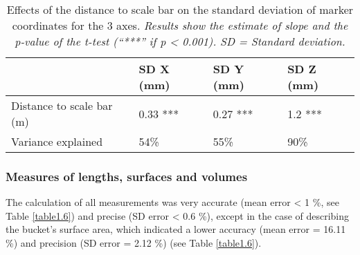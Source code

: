 \begin{table}[htbp]
  \centering
  \normalsize
  \caption[Effects of the distance to scale bar on the standard deviation of marker coordinates for the 3 axes.]{Effects of the distance to scale bar on the standard deviation of marker coordinates for the 3 axes. \textit{Results show the estimate of slope and the p-value of the t-test (“***” if p < 0.001). SD = Standard deviation.}}
  \label{table1.5}
    \begin{tabular}{@{}llll@{}}
\toprule
                          & \textbf{SD X (mm)} & \textbf{SD Y (mm)} & \textbf{SD Z (mm)} \\ \midrule
Distance to scale bar (m) & 0.33 ***           & 0.27 ***           & 1.2 ***            \\
Variance explained        & 54\%               & 55\%               & 90\%               \\ \bottomrule
\end{tabular}
\end{table}

\subsubsection{Measures of lengths, surfaces and volumes}\label{chapitre1_3.2.2}
The calculation of all measurements was very accurate (mean error < 1 \%, see Table \ref{table1.6}) and precise (SD error < 0.6 \%), except in the case of describing the bucket’s surface area, which indicated a lower accuracy (mean error = 16.11 \%) and precision (SD error = 2.12 \%) (see Table \ref{table1.6}).

